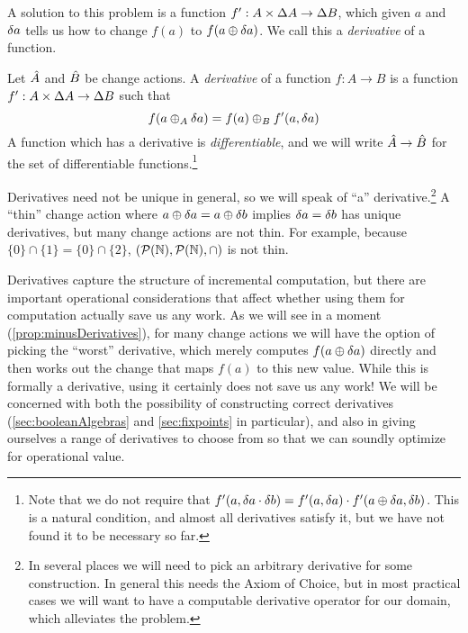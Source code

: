 A solution to this problem is a function $f': A \times \Delta A
\rightarrow \Delta B$, which given $a$ and $\delta a$ tells us how to change
$f(a)$ to $f(a \oplus \delta a)$. We call this a \emph{derivative} of a function.

\begin{defn}
  \label{def:derivative}
  Let $\hat{A}$ and $\hat{B}$ be change actions.
  A \emph{derivative} of a function $f: A \rightarrow B$ is a function $f': A \times \Delta A \rightarrow
  \Delta B$ such that
  \begin{displaymath}
    f(a \oplus_A \delta a) = f(a) \oplus_B f'(a, \delta a)
  \end{displaymath}
  A function which has a derivative is 
  \emph{differentiable}, and we will write $\hat{A} \rightarrow \hat{B}$ for
  the set of differentiable functions.\footnote{Note that we do not require that $f'(a,
    \delta a \cdot \delta b) = f'(a, \delta a) \cdot f'(a
    \oplus \delta a, \delta b)$. This is a natural condition, and almost all
    derivatives satisfy it, but we have not found it to be necessary so far.}
\end{defn}

Derivatives need not be unique in general, so we will speak of ``a''
derivative.\footnote{In several places we will need to pick an arbitrary
  derivative for some construction. In general this needs the Axiom of Choice,
  but in most practical cases we will want to have a computable derivative
  operator for our domain, which alleviates the problem.} A ``thin'' change
action \textemdash{} where $a \oplus \delta a = a \oplus \delta b$ implies $\delta a =
\delta b$ \textemdash{} has unique derivatives, but many change actions are not thin.
For example, because $\{0\} \cap \{1\} = \{0\}
\cap \{2\}$, $(\mathcal{P}(\mathbb{N}),\mathcal{P}(\mathbb{N}),\cap)$ is not thin.

Derivatives capture the structure of incremental computation, but there are
important operational considerations that affect whether using them for
computation actually save us
any work. As we will see in a moment (\cref{prop:minusDerivatives}), for many 
change actions we will have the option
of picking the ``worst'' derivative, which merely computes $f(a \oplus \delta a)$
directly and then works out the change that maps $f(a)$ to this new value. 
While this is formally a derivative, using it certainly does not save us any work! We will be concerned 
with both the possibility of constructing correct derivatives
(\cref{sec:booleanAlgebras} and \cref{sec:fixpoints} in particular), and also in
giving ourselves a range of derivatives to choose from so that we can soundly
optimize for operational value.

